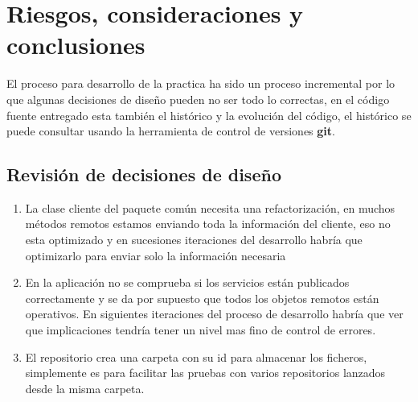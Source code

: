 \chapter{Riesgos, consideraciones y conclusiones}

El proceso para desarrollo de la practica ha sido un proceso incremental por lo que algunas decisiones de diseño pueden no ser todo lo correctas, en el código fuente entregado esta también el histórico y la evolución del código, el histórico se puede consultar usando la herramienta de control de versiones \textbf{git}.

\section{Revisión de decisiones de diseño}

\begin{enumerate}\label{sec:consideraciones_datos}
	\item La clase cliente del paquete común necesita una refactorización, en muchos métodos remotos estamos enviando toda la información del cliente, eso no esta optimizado y en sucesiones iteraciones del desarrollo habría que optimizarlo para enviar solo la información necesaria
	\item En la aplicación no se comprueba si los servicios están publicados correctamente y se da por supuesto que todos los objetos remotos están operativos. En siguientes iteraciones del proceso de desarrollo habría que ver que implicaciones tendría tener un nivel mas fino de control de errores.
	\item El repositorio crea una carpeta con su id para almacenar los ficheros, simplemente es para facilitar las pruebas con varios repositorios lanzados desde la misma carpeta.
\end{enumerate}

